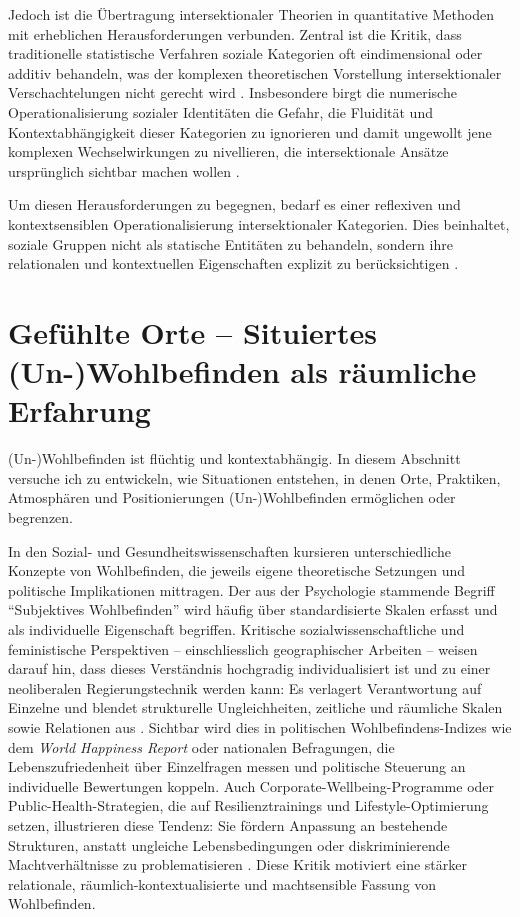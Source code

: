 Jedoch ist die Übertragung intersektionaler Theorien in quantitative Methoden mit erheblichen Herausforderungen verbunden. Zentral ist die Kritik, dass traditionelle statistische Verfahren soziale Kategorien oft eindimensional oder additiv behandeln, was der komplexen theoretischen Vorstellung intersektionaler Verschachtelungen nicht gerecht wird \parencite{hancockWhenMultiplicationDoesnt2007, bowlegInvitedReflectionQuantifying2016}. Insbesondere birgt die numerische Operationalisierung sozialer Identitäten die Gefahr, die Fluidität und Kontextabhängigkeit dieser Kategorien zu ignorieren und damit ungewollt jene komplexen Wechselwirkungen zu nivellieren, die intersektionale Ansätze ursprünglich sichtbar machen wollen \parencite{scottIntersectionalityQuantitativeMethods2017}.

Um diesen Herausforderungen zu begegnen, bedarf es einer reflexiven und kontextsensiblen Operationalisierung intersektionaler Kategorien. Dies beinhaltet, soziale Gruppen nicht als statische Entitäten zu behandeln, sondern ihre relationalen und kontextuellen Eigenschaften explizit zu berücksichtigen \parencite{rodo-de-zarateDevelopingGeographiesIntersectionality2014, websterCenteringSocialtechnicalRelations2021}.


\section{Gefühlte Orte -- Situiertes (Un-)Wohlbefinden als räumliche Erfahrung}

(Un-)Wohlbefinden ist flüchtig und kontextabhängig. In diesem Abschnitt versuche ich zu entwickeln, wie Situationen entstehen, in denen Orte, Praktiken, Atmosphären und Positionierungen (Un-)Wohlbefinden ermöglichen oder begrenzen.

In den Sozial- und Gesundheitswissenschaften kursieren unterschiedliche Konzepte von Wohlbefinden, die jeweils eigene theoretische Setzungen und politische Implikationen mittragen. Der aus der Psychologie stammende Begriff \enquote{Subjektives Wohlbefinden} wird häufig über standardisierte Skalen erfasst und als individuelle Eigenschaft begriffen. Kritische sozialwissenschaftliche und feministische Perspektiven -- einschliesslich geographischer Arbeiten -- weisen darauf hin, dass dieses Verständnis hochgradig individualisiert ist und zu einer neoliberalen Regierungstechnik werden kann: Es verlagert Verantwortung auf Einzelne und blendet strukturelle Ungleichheiten, zeitliche und räumliche Skalen sowie Relationen aus \parencite{atkinsonToxicEffectsSubjective2021}. Sichtbar wird dies in politischen Wohlbefindens-Indizes wie dem \emph{World Happiness Report} oder nationalen Befragungen, die Lebenszufriedenheit über Einzelfragen messen und politische Steuerung an individuelle Bewertungen koppeln. Auch Corporate-Wellbeing-Programme oder Public-Health-Strategien, die auf Resilienztrainings und Lifestyle-Optimierung setzen, illustrieren diese Tendenz: Sie fördern Anpassung an bestehende Strukturen, anstatt ungleiche Lebensbedingungen oder diskriminierende Machtverhältnisse zu problematisieren \parencite[\gls{vgl}]{atkinsonToxicEffectsSubjective2021}. Diese Kritik motiviert eine stärker relationale, räumlich-kontextualisierte und machtsensible Fassung von Wohlbefinden.

